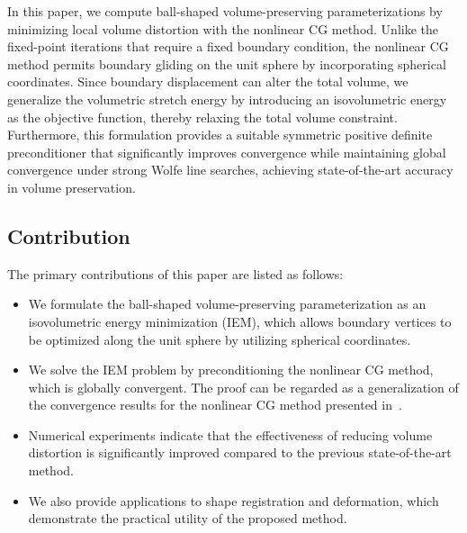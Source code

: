 \documentclass[11pt,a4paper]{article}
\begin{document}
In this paper, we compute ball-shaped volume-preserving parameterizations by minimizing local volume distortion with the nonlinear CG method. Unlike the fixed-point iterations that require a fixed boundary condition, the nonlinear CG method permits boundary gliding on the unit sphere by incorporating spherical coordinates. Since boundary displacement can alter the total volume, we generalize the volumetric stretch energy by introducing an isovolumetric energy as the objective function, thereby relaxing the total volume constraint. Furthermore, this formulation provides a suitable symmetric positive definite preconditioner that significantly improves convergence while maintaining global convergence under strong Wolfe line searches, achieving state-of-the-art accuracy in volume preservation.







\subsection{Contribution}
The primary contributions of this paper are listed as follows:
\begin{itemize}
\item[(i)] We formulate the ball-shaped volume-preserving parameterization as an isovolumetric energy minimization (IEM), which allows boundary vertices to be optimized along the unit sphere by utilizing spherical coordinates.

\item[(ii)] We solve the IEM problem by preconditioning the nonlinear CG method, which is globally convergent. The proof can be regarded as a generalization of the convergence results for the nonlinear CG method presented in~\cite[Chapter 5]{NoWr06}.

\item[(iii)] Numerical experiments indicate that the effectiveness of reducing volume distortion is significantly improved compared to the previous state-of-the-art method. 

\item[(iv)] We also provide applications to shape registration and deformation, which demonstrate the practical utility of the proposed method. 
\end{itemize}
\end{document}
